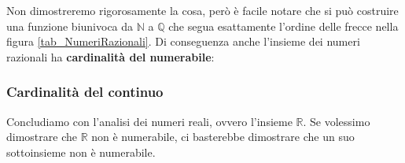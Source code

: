 Non dimostreremo rigorosamente la cosa, però è facile notare che si può costruire una funzione biunivoca da $\mathbb{N}$ a $\mathbb{Q}$ che segua esattamente l'ordine delle frecce nella figura \ref{tab_NumeriRazionali}. Di conseguenza anche l'insieme dei numeri razionali ha \textbf{cardinalità del numerabile}:

\subsubsection{Cardinalità del continuo}
Concludiamo con l'analisi dei numeri reali, ovvero l'insieme $\mathbb{R}$. Se volessimo dimostrare che $\mathbb{R}$ non è numerabile, ci basterebbe dimostrare che un suo sottoinsieme non è numerabile.
